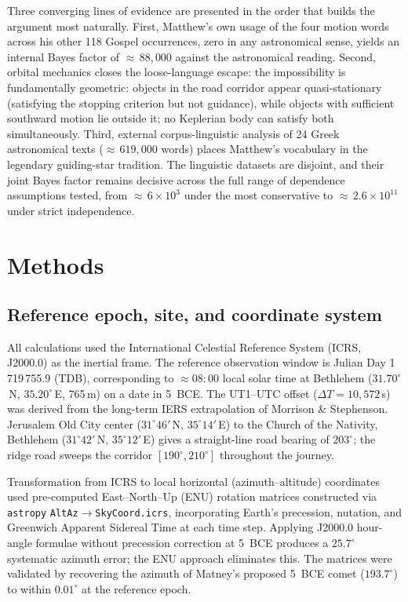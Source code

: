 \documentclass[sn-nature]{sn-jnl}
\begin{document}
Three converging lines of evidence are presented in the order that builds
the argument most naturally.
First, Matthew's own usage of the four motion words across his other 118
Gospel occurrences, zero in any astronomical sense, yields an internal
Bayes factor of ${\approx}\,88{,}000$ against the astronomical reading.
Second, orbital mechanics closes the loose-language escape: the impossibility
is fundamentally geometric: objects in the road corridor appear quasi-stationary
(satisfying the stopping criterion but not guidance), while objects with
sufficient southward motion lie outside it; no Keplerian body can satisfy both
simultaneously.
Third, external corpus-linguistic analysis of 24 Greek astronomical texts
(${\approx}\,619{,}000$ words) places Matthew's vocabulary in the legendary
guiding-star tradition. The linguistic datasets are disjoint, and their
joint Bayes factor remains decisive across the full range of dependence
assumptions tested, from ${\approx}\,6\times10^{3}$ under the most
conservative to ${\approx}\,2.6\times10^{11}$ under strict independence.

\section{Methods}\label{sec:methods}

\subsection{Reference epoch, site, and coordinate system}

All calculations used the International Celestial Reference System (ICRS,
J2000.0) as the inertial frame. The reference observation window is Julian
Day 1\,719\,755.9 (TDB), corresponding to $\approx\!08{:}00$ local solar
time at Bethlehem ($31.70^\circ$\,N, $35.20^\circ$\,E, 765\,m) on a date
in 5~BCE. The UT1--UTC offset ($\Delta T = 10{,}572$\,s) was derived from
the long-term IERS extrapolation of Morrison \& Stephenson\cite{morrison2004}.
Jerusalem Old City center ($31^\circ 46'$\,N, $35^\circ 14'$\,E) to the
Church of the Nativity, Bethlehem ($31^\circ 42'$\,N, $35^\circ 12'$\,E)
gives a straight-line road bearing of $203^\circ$; the ridge road sweeps
the corridor $[190^\circ, 210^\circ]$ throughout the journey.

Transformation from ICRS to local horizontal (azimuth--altitude) coordinates
used pre-computed East--North--Up (ENU) rotation matrices constructed via
\texttt{astropy}\cite{astropy2022} \texttt{AltAz}$\to$\texttt{SkyCoord.icrs},
incorporating Earth's precession, nutation, and Greenwich Apparent Sidereal
Time at each time step. Applying J2000.0 hour-angle formulae without
precession correction at 5~BCE produces a $25.7^\circ$ systematic azimuth
error; the ENU approach eliminates this. The matrices were validated by
recovering the azimuth of Matney's proposed 5~BCE comet\cite{matney2025jbaa}
($193.7^\circ$) to within $0.01^\circ$ at the reference epoch.
\end{document}
